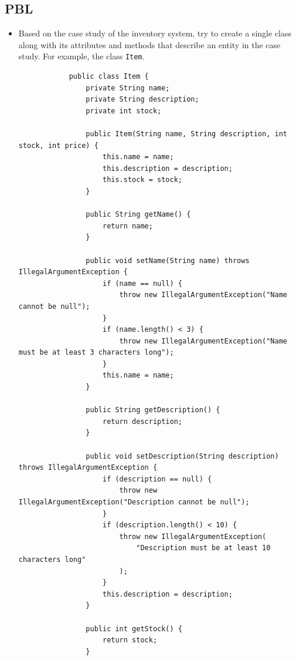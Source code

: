 \documentclass[12pt,titlepage]{article}
\begin{document}
\subsection*{PBL}
\begin{itemize}
    \item {
        Based on the case study of the inventory system, try to create a single class along with its
        attributes and methods that describe an entity in the case study. For example, the class \texttt{Item}.

        \begin{verbatim}
            public class Item {
                private String name;
                private String description;
                private int stock;

                public Item(String name, String description, int stock, int price) {
                    this.name = name;
                    this.description = description;
                    this.stock = stock;
                }

                public String getName() {
                    return name;
                }

                public void setName(String name) throws IllegalArgumentException {
                    if (name == null) {
                        throw new IllegalArgumentException("Name cannot be null");
                    }
                    if (name.length() < 3) {
                        throw new IllegalArgumentException("Name must be at least 3 characters long");
                    }
                    this.name = name;
                }

                public String getDescription() {
                    return description;
                }

                public void setDescription(String description) throws IllegalArgumentException {
                    if (description == null) {
                        throw new IllegalArgumentException("Description cannot be null");
                    }
                    if (description.length() < 10) {
                        throw new IllegalArgumentException(
                            "Description must be at least 10 characters long"
                        );
                    }
                    this.description = description;
                }

                public int getStock() {
                    return stock;
                }


\end{verbatim}}
\end{itemize}
\end{document}
